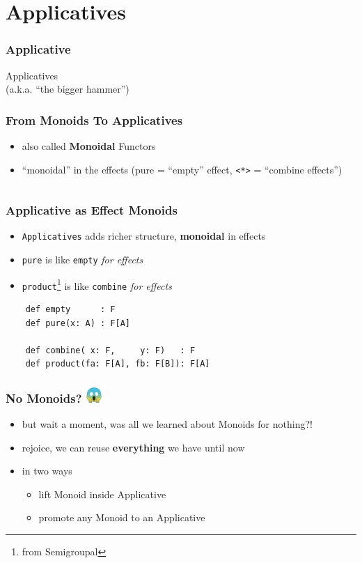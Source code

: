 \documentclass[aspectratio=169]{beamer}
\begin{document}
\section{Applicatives}\label{sec:applicatives}

\begin{frame}
  \frametitle{Applicative}
  \begin{center}
    { \huge Applicatives\\ }
    (a.k.a. ``the bigger hammer'')
  \end{center}
\end{frame}

\begin{frame}[fragile]
  \frametitle{From Monoids To Applicatives}
  \begin{itemize}
  \item also called \textbf{Monoidal} Functors
  \item ``monoidal'' in the effects (pure = ``empty'' effect, \texttt{<*>} = ``combine effects'')
  \end{itemize}
  \vspace{5mm}
  \inputminted[fontsize=\small]{scala}{snippets/applicative-def.scala}
\end{frame}

\begin{frame}[fragile]
  \frametitle{Applicative as Effect Monoids}
  \begin{itemize}
  \item \texttt{Applicatives} adds richer structure, \textbf{monoidal} in effects
  \item \texttt{pure} is like \texttt{empty} \textit{for effects}
  \item \texttt{product}\footnote{from Semigroupal} is like \texttt{combine} \textit{for effects}
  \end{itemize}
  \begin{verbatim}
    def empty      : F
    def pure(x: A) : F[A]

    def combine( x: F,     y: F)   : F
    def product(fa: F[A], fb: F[B]): F[A]
  \end{verbatim}
\end{frame}

\begin{frame}
  \frametitle{No Monoids? \includegraphics[width=6mm, valign=c]{static-images/scream.png}}
  \begin{itemize}
  \item but wait a moment, was all we learned about Monoids for nothing?!
  \item rejoice, we can reuse \textbf{everything} we have until now
  \item in two ways
    \begin{itemize}
    \item lift Monoid inside Applicative
    \item promote any Monoid to an Applicative
    \end{itemize}
  \end{itemize}
\end{frame}
\end{document}
